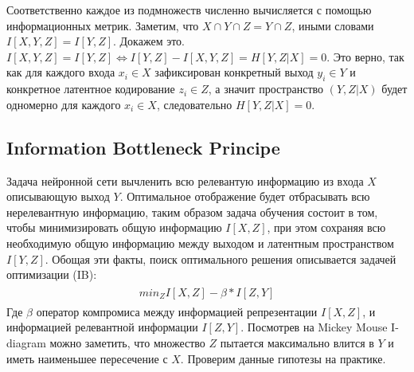 Соответственно каждое из подмножеств численно вычисляется с помощью информационных метрик. Заметим, что $X \cap Y \cap Z = Y \cap Z$, иными словами $I[X, Y, Z] = I[Y, Z]$. Докажем это. $I[X, Y, Z] = I[Y, Z] \Leftrightarrow I[Y, Z] - I[X, Y, Z] = H[Y, Z | X] = 0$. Это верно, так как для каждого входа $x_i \in X$ зафиксирован конкретный выход $y_i \in Y$ и конкретное латентное кодирование $z_i \in Z$, а значит пространство $(Y, Z | X)$ будет одномерно для каждого $x_i \in X$, следовательно $H[Y, Z | X] = 0$.
\subsection{Information Bottleneck Principe}
Задача нейронной сети вычленить всю релевантую информацию из входа $X$ описывающую выход $Y$. Оптимальное отображение будет отбрасывать всю нерелевантную информацию, таким образом задача обучения состоит в том, чтобы минимизировать общую информацию $I[X, Z]$, при этом сохраняя всю необходимую общую информацию между выходом и латентным пространством $I[Y, Z]$. Обощая эти факты, поиск оптимального решения описывается задачей оптимизации (IB):
\begin{gather}
\begin{aligned}
min_{Z} I[X, Z] - \beta * I[Z, Y]
\end{aligned}
\end{gather}
Где $\beta$ оператор компромиса между информацией репрезентации $I[X, Z]$, и информацией релевантной информации $I[Z, Y]$. Посмотрев на Mickey Mouse I-diagram можно заметить, что множество $Z$ пытается максимально влится в $Y$ и иметь наименьшее пересечение с $X$. Проверим данные гипотезы на практике.








